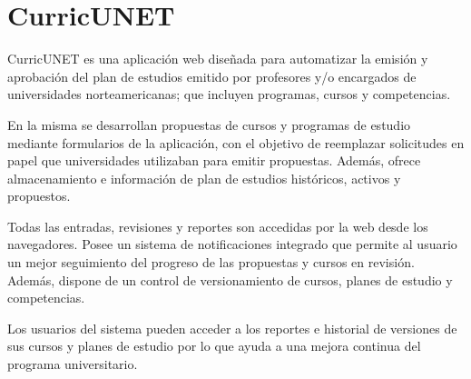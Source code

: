 \section{CurricUNET}
CurricUNET es una aplicación web diseñada para automatizar la emisión y aprobación del plan de estudios emitido por profesores y/o encargados de universidades norteamericanas; que incluyen programas, cursos y competencias\citep{curricunet_webpage}.

En la misma se desarrollan propuestas de cursos y programas de estudio mediante formularios de la aplicación, con el objetivo de reemplazar solicitudes en papel que universidades utilizaban para emitir propuestas. Además, ofrece almacenamiento e información de plan de estudios históricos, activos y propuestos.

Todas las entradas, revisiones y reportes son accedidas por la web desde los navegadores. Posee un sistema de notificaciones integrado que permite al usuario un mejor seguimiento del progreso de las propuestas y cursos en revisión. Además, dispone de un control de versionamiento de cursos, planes de estudio y competencias.

Los usuarios del sistema pueden acceder a los reportes e historial de versiones de sus cursos y planes de estudio por lo que ayuda a una mejora continua del programa universitario.
